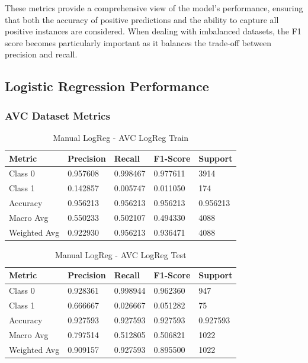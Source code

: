 \documentclass[a4paper,12pt]{article}
\begin{document}
These metrics provide a comprehensive view of the model's performance, ensuring that both the accuracy of positive predictions and the ability to capture all positive instances are considered. When dealing with imbalanced datasets, the F1 score becomes particularly important as it balances the trade-off between precision and recall.

\subsection{Logistic Regression Performance}

\subsubsection{AVC Dataset Metrics}

\begin{table}[h!]
    \centering
    \caption{Manual LogReg - AVC LogReg Train}
    \begin{tabularx}{\textwidth}{|l|X|X|X|X|}
    \hline
    \textbf{Metric} & \textbf{Precision} & \textbf{Recall} & \textbf{F1-Score} & \textbf{Support} \\
    \hline
    Class 0 & 0.957608 & 0.998467 & 0.977611 & 3914 \\
    Class 1 & 0.142857 & 0.005747 & 0.011050 & 174 \\
    Accuracy & 0.956213 & 0.956213 & 0.956213 & 0.956213 \\
    Macro Avg & 0.550233 & 0.502107 & 0.494330 & 4088 \\
    Weighted Avg & 0.922930 & 0.956213 & 0.936471 & 4088 \\
    \hline
    \end{tabularx}
    \end{table}
    
    \begin{table}[h!]
    \centering
    \caption{Manual LogReg - AVC LogReg Test}
    \begin{tabularx}{\textwidth}{|l|X|X|X|X|}
    \hline
    \textbf{Metric} & \textbf{Precision} & \textbf{Recall} & \textbf{F1-Score} & \textbf{Support} \\
    \hline
    Class 0 & 0.928361 & 0.998944 & 0.962360 & 947 \\
    Class 1 & 0.666667 & 0.026667 & 0.051282 & 75 \\
    Accuracy & 0.927593 & 0.927593 & 0.927593 & 0.927593 \\
    Macro Avg & 0.797514 & 0.512805 & 0.506821 & 1022 \\
    Weighted Avg & 0.909157 & 0.927593 & 0.895500 & 1022 \\
    \hline
    \end{tabularx}
    \end{table}
    
\end{document}
